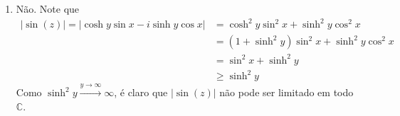 \documentclass[12pt,a4paper]{article}
\begin{document}
\begin{enumerate}
\begin{enumerate}
		\end{enumerate}
	
		\item Não. Note que
		\begin{align*}
		|\sin(z)| = |\cosh y\sin x - i\sinh y\cos x| &= \cosh^2 y\sin^2 x + \sinh^2 y\cos^2 x \\ 
		&= (1+\sinh^2 y)\sin^2 x + \sinh^2 y\cos^2 x \\ 
		&= \sin^2 x + \sinh^2 y \\
		&\geq \sinh^2y
		\end{align*}
		Como $\sinh^2 y\xrightarrow{y\to\infty}\infty$, é claro que $|\sin(z)|$ não pode ser limitado em todo $\mathbb{C}$. 
	\end{enumerate} 
\end{document}
